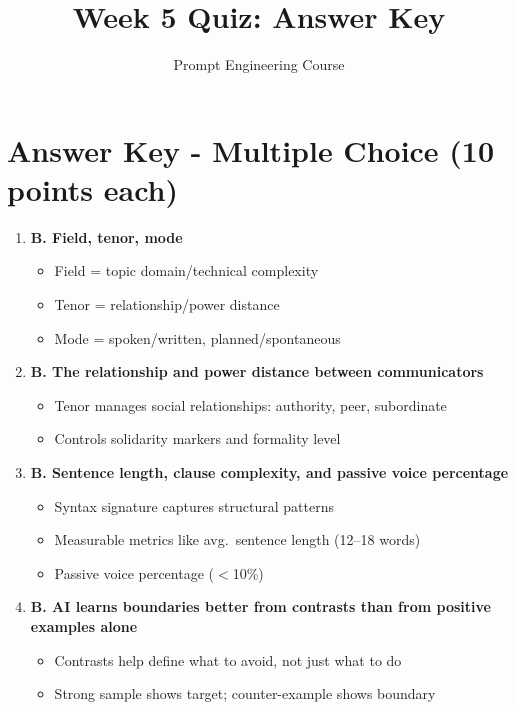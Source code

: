 \documentclass[11pt]{article}
\title{Week 5 Quiz: Answer Key}
\author{Prompt Engineering Course}
\date{}
\begin{document}
\maketitle

\section*{Answer Key - Multiple Choice (10 points each)}

\begin{enumerate}

\item \textbf{B. Field, tenor, mode}
\begin{itemize}
    \item Field = topic domain/technical complexity
    \item Tenor = relationship/power distance
    \item Mode = spoken/written, planned/spontaneous
\end{itemize}

\item \textbf{B. The relationship and power distance between communicators}
\begin{itemize}
    \item Tenor manages social relationships: authority, peer, subordinate
    \item Controls solidarity markers and formality level
\end{itemize}

\item \textbf{B. Sentence length, clause complexity, and passive voice percentage}
\begin{itemize}
    \item Syntax signature captures structural patterns
    \item Measurable metrics like avg.\ sentence length (12--18 words)
    \item Passive voice percentage ($<$10\%)
\end{itemize}

\item \textbf{B. AI learns boundaries better from contrasts than from positive examples alone}
\begin{itemize}
    \item Contrasts help define what to avoid, not just what to do
    \item Strong sample shows target; counter-example shows boundary
\end{itemize}


\end{enumerate}
\end{document}
